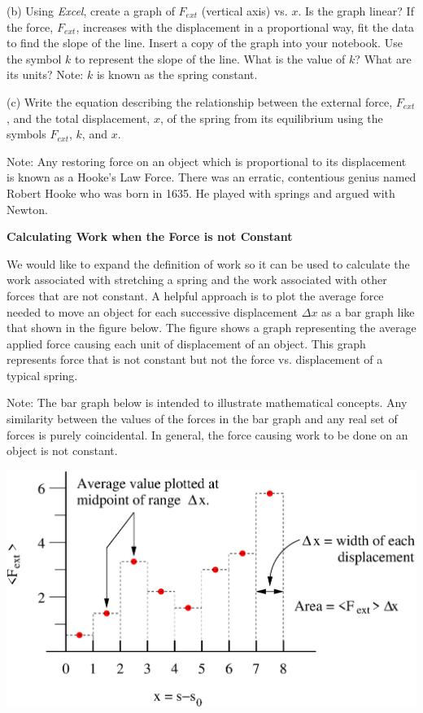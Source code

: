 (b) Using \textit{Excel}, create a graph of \( F_{ext} \) (vertical axis) vs. $x$. 
Is the graph linear?
If the force, \( F_{ext} \), increases with the displacement in a proportional
way, fit the data to find the slope of the line. Insert a copy of the graph
into your notebook. Use the symbol $k$ to represent the slope of the line. What
is the value of $k$? What are its units? Note: 
$k$ is known as the spring constant.
\vspace{10mm}

(c) Write the equation describing the relationship between the external force,
\( F_{ext} \), and the total displacement, 
$x$, of the spring from its equilibrium
using the symbols \( F_{ext} \), $k$, and $x$.
\vspace{10mm}

Note: Any restoring force on an object which is proportional to its displacement
is known as a Hooke's Law Force. There was an erratic, contentious genius named
Robert Hooke who was born in 1635. He played with springs and argued with Newton.

\newpage

\textbf{Calculating Work when the Force is not Constant }

We would like to expand the definition of work so it can be used to calculate
the work associated with stretching a spring and the work associated with other
forces that are not constant. A helpful approach is to plot the average force
needed to move an object for each successive displacement \( \Delta  x\) as
a bar graph like that shown in the figure below. The figure shows a graph representing
the average applied force causing each unit of displacement of an object. This
graph represents force that is not constant but not the force vs. displacement
of a typical spring.

Note: The bar graph below is intended to illustrate mathematical concepts. Any
similarity between the values of the forces in the bar graph and any real set
of forces is purely coincidental. In general, the force causing work to be done
on an object is not constant.

\vspace{0.3cm}
{\par\centering \includegraphics[width=6.0in]{workAndKE/workAndKEF1.eps} \par}
\vspace{0.3cm}

